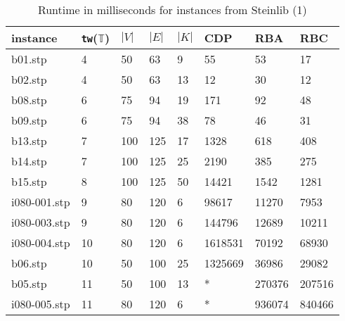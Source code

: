 \documentclass{llncs}
\begin{document}
\begin{table}[!h]
\begin{center}
\begin{tabular}{l l l l l | l l l }
\hline
instance & \texttt{tw}($\mathbb{T}$) & $|V|$ & $|E|$ & $|K|$ & CDP & RBA & RBC\\
\hline
\hline
b01.stp	&	4	&	50	&	63	&	9	&	55	&	53	&	17	\\
b02.stp	&	4	&	50	&	63	&	13	&	12	&	30	&	12	\\
b08.stp	&	6	&	75	&	94	&	19	&	171	&	92	&	48	\\
b09.stp	&	6	&	75	&	94	&	38	&	78	&	46	&	31	\\
b13.stp	&	7	&	100	&	125	&	17	&	1328	&	618	&	408	\\
b14.stp	&	7	&	100	&	125	&	25	&	2190	&	385	&	275	\\
b15.stp	&	8	&	100	&	125	&	50	&	14421	&	1542	&	1281	\\
i080-001.stp	&	9	&	80	&	120	&	6	&	98617	&	11270	&	7953	\\
i080-003.stp	&	9	&	80	&	120	&	6	&	144796	&	12689	&	10211	\\
i080-004.stp	&	10	&	80	&	120	&	6	&	1618531	&	70192	&	68930	\\
b06.stp	&	10	&	50	&	100	&	25	&	1325669	&	36986	&	29082	\\
b05.stp	&	11	&	50	&	100	&	13	&	*	&	270376	&	207516\\
i080-005.stp &	11	&	80	&	120	&	6	&	*	&	936074	&	840466\\
\hline
\end{tabular}
\end{center}
\caption{Runtime in milliseconds for instances from Steinlib (1)}
\label{t1:a}
\end{table}
\end{document}
